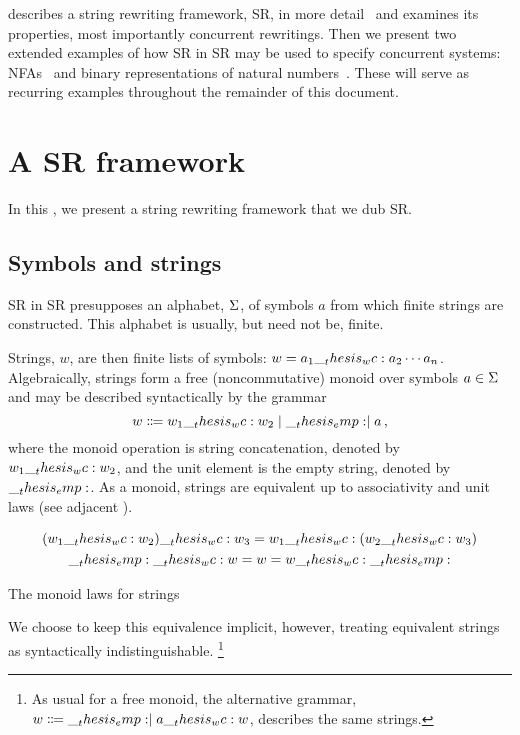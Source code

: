  describes a string rewriting framework, \acs{SR}, in more detail~ and examines its properties, most importantly concurrent rewritings.
Then we present two extended examples of how \acl{SR} in \acs{SR} may be used to specify concurrent systems: \aclp*{NFA}~ and binary representations of natural numbers~.
These will serve as recurring examples throughout the remainder of this document.

\section{A \acl*{SR} framework}\label{sec:string-rewriting:framework}

In this , we present a string rewriting framework that we dub \acs{SR}.

\subsection{Symbols and strings}

\Acl{SR} in \acs{SR} presupposes an alphabet, $\Sigma$, of symbols $a$ from which finite strings are constructed.
This alphabet is usually, but need not be, finite.

Strings, $w$, are then finite lists of symbols: $w = a_1 \wc a_2 \dotsb a_n$.
Algebraically, strings form a free (noncommutative) monoid over symbols $a \in \Sigma$ and may be described syntactically by the grammar
\begin{equation*}
  w \Coloneqq w_1 \wc w_2 \mid \emp \mid a
  \,,
\end{equation*}
where the monoid operation is string concatenation, denoted by $w_1 \wc w_2$, and the unit element is the empty string, denoted by $\__thesis_emp:$.
As a monoid, strings are equivalent up to associativity and unit laws (see adjacent ).%
\begin{marginfigure}
  \begin{gather*}
    (w_1 \wc w_2) \wc w_3 = w_1 \wc (w_2 \wc w_3) \\
    \emp \wc w = w = w \wc \emp
  \end{gather*}
  \caption{The monoid laws for strings}\label{fig:string-rewriting:monoid-laws}
\end{marginfigure}
We choose to keep this equivalence implicit, however, treating equivalent strings as syntactically indistinguishable.%
\footnote{As usual for a free monoid, the alternative grammar,
    $w \Coloneqq \emp \mid a \wc w$,
  describes the same strings.}



